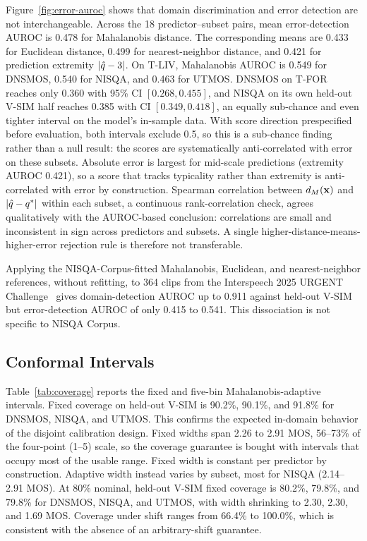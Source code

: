 Figure~\ref{fig:error-auroc} shows that domain discrimination and error detection are not interchangeable. Across the 18 predictor--subset pairs, mean error-detection AUROC is 0.478 for Mahalanobis distance. The corresponding means are 0.433 for Euclidean distance, 0.499 for nearest-neighbor distance, and 0.421 for prediction extremity $|\hat{q}-3|$. On T-LIV, Mahalanobis AUROC is 0.549 for DNSMOS, 0.540 for NISQA, and 0.463 for UTMOS. DNSMOS on T-FOR reaches only 0.360 with 95\% CI $[0.268,0.455]$, and NISQA on its own held-out V-SIM half reaches 0.385 with CI $[0.349,0.418]$, an equally sub-chance and even tighter interval on the model's in-sample data. With score direction prespecified before evaluation, both intervals exclude 0.5, so this is a sub-chance finding rather than a null result: the scores are systematically anti-correlated with error on these subsets. Absolute error is largest for mid-scale predictions (extremity AUROC 0.421), so a score that tracks typicality rather than extremity is anti-correlated with error by construction. Spearman correlation between $d_{M}(\mathbf{x})$ and $|\hat{q}-q^{*}|$ within each subset, a continuous rank-correlation check, agrees qualitatively with the AUROC-based conclusion: correlations are small and inconsistent in sign across predictors and subsets. A single higher-distance-means-higher-error rejection rule is therefore not transferable.

Applying the NISQA-Corpus-fitted Mahalanobis, Euclidean, and nearest-neighbor references, without refitting, to 364 clips from the Interspeech 2025 URGENT Challenge~\cite{Sach2025} gives domain-detection AUROC up to 0.911 against held-out V-SIM but error-detection AUROC of only 0.415 to 0.541. This dissociation is not specific to NISQA Corpus.

\vspace{-.2cm}
\subsection{Conformal Intervals}
\label{ssec:interval-results}

Table~\ref{tab:coverage} reports the fixed and five-bin Mahalanobis-adaptive intervals. Fixed coverage on held-out V-SIM is 90.2\%, 90.1\%, and 91.8\% for DNSMOS, NISQA, and UTMOS. This confirms the expected in-domain behavior of the disjoint calibration design. Fixed widths span 2.26 to 2.91 MOS, 56--73\% of the four-point (1--5) scale, so the coverage guarantee is bought with intervals that occupy most of the usable range. Fixed width is constant per predictor by construction. Adaptive width instead varies by subset, most for NISQA (2.14--2.91 MOS). At 80\% nominal, held-out V-SIM fixed coverage is 80.2\%, 79.8\%, and 79.8\% for DNSMOS, NISQA, and UTMOS, with width shrinking to 2.30, 2.30, and 1.69 MOS. Coverage under shift ranges from 66.4\% to 100.0\%, which is consistent with the absence of an arbitrary-shift guarantee.

